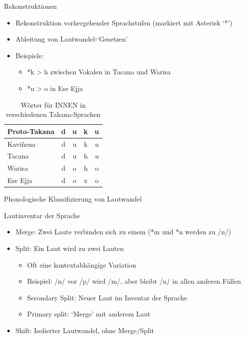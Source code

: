 \begin{frame}{Rekonstruktionen}
\begin{itemize}
	\item Rekonstruktion vorhergehender Sprachstufen (markiert mit Asterisk `*')
	\item Ableitung von Lautwandel-`Gesetzen' \pause
	\item Beispiele: 
	\begin{itemize}
		\item *k > h zwischen Vokalen in Tacana und Warisa
		\item *u > o in Ese Ejja
	\end{itemize}
\end{itemize}
	\begin{table}
		\begin{tabular}[pos]{|l|c|c|c|c|}
			\hline
			Proto-Takana	& d	& u	& k	& u \\ \hline
			Kaviñena		& d	& u	& k	& u \\
			Tacana			& d	& u	& h	& u \\
			Warisa			& d	& o	& h	& o \\
			Ese	Ejja		& d	& o	& x	& o \\
			\hline
		\end{tabular}
		\caption{Wörter für \textsc{INNEN} in verschiedenen Takana-Sprachen \parencite{Girard1971}}
	\end{table}
\end{frame}

\begin{frame}{Phonologische Klassifizierung von Lautwandel}
	\begin{block}{Lautinventar der Sprache}
		\begin{itemize}
			\item Merge: Zwei Laute verbinden sich zu einem (*m und *n werden zu /n/) \pause
			\item Split: Ein Laut wird zu zwei Lauten
			\begin{itemize}
				\item Oft eine kontextabhängige Variation
				\item Beispiel: /n/ vor /p/ wird /m/, aber bleibt /n/ in allen anderen Fällen \pause
				\item Secondary Split: Neuer Laut im Inventar der Sprache
				\item Primary split: `Merge' mit anderem Laut
			\end{itemize}
			\item Shift: Isolierter Lautwandel, ohne Merge/Split
		\end{itemize}
	\end{block}
\end{frame}


